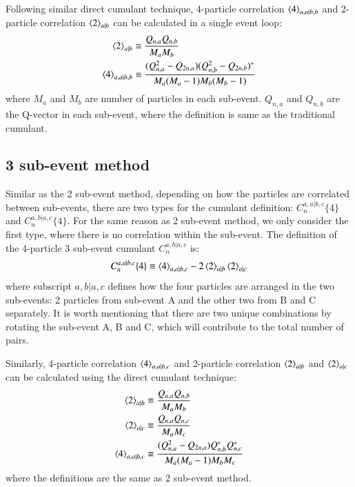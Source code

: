 Following similar direct cumulant technique, 4-particle correlation $\left\langle 4\right\rangle_{a,a|b,b}$ and 2-particle correlation $\left\langle 2\right\rangle_{a|b}$ can be calculated in a single event loop:
\begin{equation}
\begin{split}
\left\langle 2\right\rangle_{a|b}&\equiv \frac{Q_{n,a}Q_{n,b}}{M_{a}M_{b}} \\
\left\langle 4\right\rangle_{a,a|b,b}&\equiv \frac{(Q_{n,a}^{2}-Q_{2n,a})(Q_{n,b}^{2}-Q_{2n,b})^{*}}{M_{a}(M_{a}-1)M_{b}(M_{b}-1)}
\end{split}
\end{equation}
where $M_{a}$ and $M_{b}$ are number of particles in each sub-event. $Q_{n,a}$ and $Q_{n,b}$ are the Q-vector in each sub-event, where the definition is same as the traditional cumulant.



\subsection{3 sub-event method}
Similar as the 2 sub-event method, depending on how the particles are correlated between sub-events, there are two types for the cumulant definition: $C_{n}^{a,a|b,c}\{4\}$ and $C_{n}^{a,b|a,c}\{4\}$. For the same reason as 2 sub-event method, we only consider the first type, where there is no correlation within the sub-event. The definition of the 4-particle 3 sub-event cumulant $C_{n}^{a,b|a,c}$ is:
\begin{equation}
C_{n}^{a,a|b,c}\{4\} \equiv \left\langle 4\right\rangle_{a,a|b,c}-2\left\langle 2\right\rangle_{a|b}\left\langle 2\right\rangle_{a|c}
\end{equation}
where subscript $a,b|a,c$ defines how the four particles are arranged in the two sub-events: 2 particles from sub-event A and the other two from B and C separately. It is worth mentioning that there are two unique combinations by rotating the sub-event A, B and C, which will contribute to the total number of pairs.

Similarly, 4-particle correlation $\left\langle 4\right\rangle_{a,a|b,c}$ and 2-particle correlation $\left\langle 2\right\rangle_{a|b}$ and $\left\langle 2\right\rangle_{a|c}$ can be calculated using the direct cumulant technique:
\begin{equation}
\begin{split}
\left\langle 2\right\rangle_{a|b}&\equiv \frac{Q_{n,a}Q_{n,b}}{M_{a}M_{b}} \\
\left\langle 2\right\rangle_{a|c}&\equiv \frac{Q_{n,a}Q_{n,c}}{M_{a}M_{c}} \\
\left\langle 4\right\rangle_{a,a|b,c}&\equiv \frac{(Q_{n,a}^{2}-Q_{2n,a})Q_{n,b}^{*}Q_{n,c}^{*}}{M_{a}(M_{a}-1)M_{b}M_{c}}
\end{split}
\end{equation}
where the definitions are the same as 2 sub-event method.

